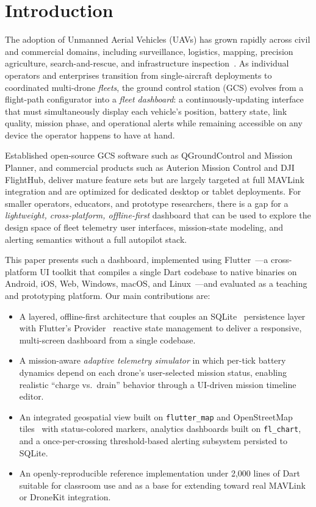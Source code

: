\documentclass[conference]{IEEEtran}
\begin{document}
\section{Introduction}
\label{sec:intro}

The adoption of Unmanned Aerial Vehicles (UAVs) has grown rapidly across civil and commercial domains, including surveillance, logistics, mapping, precision agriculture, search-and-rescue, and infrastructure inspection~\cite{shakhatreh2019uav}. As individual operators and enterprises transition from single-aircraft deployments to coordinated multi-drone \emph{fleets}, the ground control station (GCS) evolves from a flight-path configurator into a \emph{fleet dashboard}: a continuously-updating interface that must simultaneously display each vehicle's position, battery state, link quality, mission phase, and operational alerts while remaining accessible on any device the operator happens to have at hand.

Established open-source GCS software such as QGroundControl and Mission Planner, and commercial products such as Auterion Mission Control and DJI FlightHub, deliver mature feature sets but are largely targeted at full MAVLink~\cite{koubaa2019mavlink} integration and are optimized for dedicated desktop or tablet deployments. For smaller operators, educators, and prototype researchers, there is a gap for a \emph{lightweight, cross-platform, offline-first} dashboard that can be used to explore the design space of fleet telemetry user interfaces, mission-state modeling, and alerting semantics without a full autopilot stack.

This paper presents such a dashboard, implemented using Flutter~\cite{flutter_framework}---a cross-platform UI toolkit that compiles a single Dart codebase to native binaries on Android, iOS, Web, Windows, macOS, and Linux~\cite{biorn2019cross}---and evaluated as a teaching and prototyping platform. Our main contributions are:

\begin{itemize}
    \item A layered, offline-first architecture that couples an SQLite~\cite{sqlite_docs} persistence layer with Flutter's Provider~\cite{provider_pkg} reactive state management to deliver a responsive, multi-screen dashboard from a single codebase.
    \item A mission-aware \emph{adaptive telemetry simulator} in which per-tick battery dynamics depend on each drone's user-selected mission status, enabling realistic ``charge vs.\ drain'' behavior through a UI-driven mission timeline editor.
    \item An integrated geospatial view built on \texttt{flutter\_map} and OpenStreetMap tiles~\cite{haklay2008osm} with status-colored markers, analytics dashboards built on \texttt{fl\_chart}, and a once-per-crossing threshold-based alerting subsystem persisted to SQLite.
    \item An openly-reproducible reference implementation under 2{,}000 lines of Dart suitable for classroom use and as a base for extending toward real MAVLink or DroneKit integration.
\end{itemize}
\end{document}
